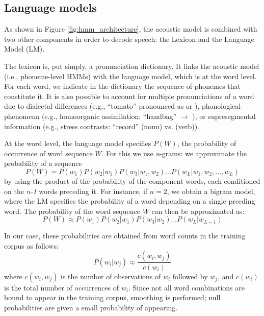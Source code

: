 \subsection{Language models}
As shown in Figure \ref{fig:hmm_architecture}, the acoustic model is combined with two other components in order to decode speech: the Lexicon and the Language Model (LM).

The lexicon is, put simply, a pronunciation dictionary. It links the acoustic model (i.e., phoneme-level HMMs) with the language model, which is at the word level. For each word, we indicate in the dictionary the sequence of phonemes that constitute it. It is also possible to account for multiple pronunciations of a word due to dialectal differences (e.g., ``tomato'' pronounced as  or ), phonological phenomena (e.g., homoorganic assimilation: ``handbag''  $\rightarrow$ ), or supresegmental information (e.g., stress contrasts: ``record''  (noun) vs.  (verb)).

At the word level, the language model specifies $P(W)$, the probability of occurrence of word sequence $W$. For this we use \textit{n}-grams: we approximate the probability of a sequence
\begin{equation}
P(W) = P(w_{1})P(w_2|w_1)P(w_3 | w_1, w_2)...P(w_L | w_1, w_2, ..., w_L)
\end{equation}
by using the product of the probability of the component words, each conditioned on the \textit{n-1} words preceding it. For instance, if $n = 2$, we obtain a bigram model, where the LM specifies the probability of a word depending on a single prceding word. The probability of the word sequence $W$ can then be approximated as:    
\begin{equation}
P(W) \approx P(w_{1})P(w_2|w_1)P(w_3 | w_2)...P(w_L | w_{L-1})
\end{equation}

In our case, these probabilities are obtained from word counts in the training corpus as follows:
\begin{equation}
P(w_i | w_j) \approx \frac{c(w_i, w_j)}{c(w_i)}
\end{equation}
where $c(w_i, w_j)$ is the number of observations of $w_i$ followed by $w_j$, and $c(w_i)$ is the total number of occurrences of $w_i$.
Since not all word combinations are bound to appear in the training corpus, smoothing is performed; null probabilities are given a small probability of appearing. 

